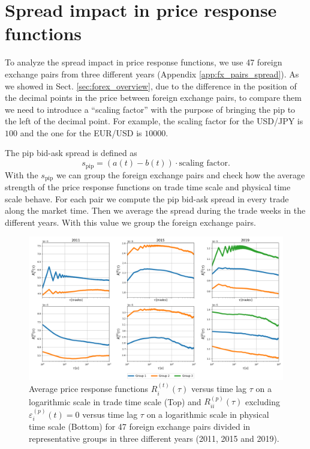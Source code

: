 \section{Spread impact in price response functions}\label{sec:spread_impact}

To analyze the spread impact in price response functions, we use 47 foreign
exchange pairs from three different years (Appendix \ref{app:fx_pairs_spread}).
As we showed in Sect. \ref{sec:forex_overview}, due to the difference in the
position of the decimal points in the price between foreign exchange pairs, to
compare them we need to introduce a ``scaling factor'' with the purpose of
bringing the pip to the left of the decimal point. For example, the scaling
factor for the USD/JPY is $100$ and the one for the EUR/USD is $10000$.

The pip bid-ask spread is defined as \cite{micro_eff}
\begin{equation}
    s_{\textrm{pip}} = \left(a\left(t\right) - b\left(t\right)\right) \cdot
    \textrm{scaling factor}.
\end{equation}
With the $s_{\textrm{pip}}$ we can group the foreign exchange pairs and check
how the average strength of the price response functions on trade time scale
and physical time scale behave. For each pair we compute the pip bid-ask spread
in every trade along the market time. Then we average the spread during the
trade weeks in the different years. With this value we group the foreign
exchange pairs.

\begin{figure}[htbp]
    \centering
    \includegraphics[width=\textwidth]{figures/05_spread_impact.png}
    \caption{Average price response functions
             $R^{\left(t\right)}_{i}\left(\tau\right)$ versus time lag $\tau$
             on a logarithmic scale in trade time scale (Top) and
             $R^{\left(p\right)}_{ii}\left(\tau\right)$ excluding
             $\varepsilon^{\left(p\right)}_{i}\left(t\right) = 0$ versus time
             lag $\tau$ on a logarithmic scale in physical time scale (Bottom)
             for 47 foreign exchange pairs divided in representative groups in
             three different years (2011, 2015 and 2019).}
    \label{fig:spread_impact}
\end{figure}

